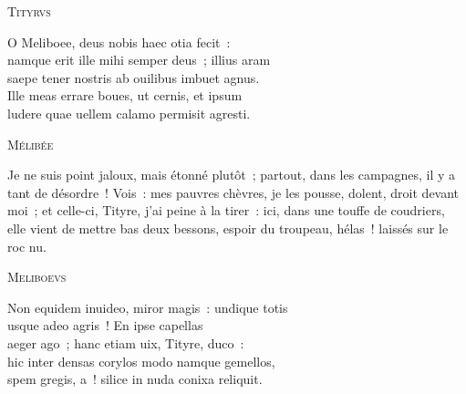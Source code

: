 \documentclass[a4paper,12pt,twoside, titlepage]{book}
\begin{document}
\begin{alignment}
\begin{translation}
\end{translation}

\begin{edition}
    \begin{center}\textsc{Tityrvs}\end{center}
    \begin{ekdverse}
O Meliboee, deus nobis haec otia fecit~:\\
namque erit ille mihi semper deus~; illius aram\\
saepe tener nostris ab ouilibus imbuet agnus.\\
Ille meas errare boues, ut cernis, et ipsum\\
ludere quae uellem calamo permisit agresti.\\
\end{ekdverse}
\end{edition}




\begin{translation}

\begin{center}\textsc{Mélibée}\end{center}


Je ne suis point jaloux, mais étonné plutôt~; partout, dans les campagnes, il y a tant de désordre~! Vois~: mes pauvres chèvres, je les pousse, dolent, droit devant moi~; et celle-ci, Tityre, j'ai peine à la tirer~: ici, dans une touffe de coudriers, elle vient de mettre bas deux bessons, espoir du troupeau, hélas~! laissés sur le roc nu.

\end{translation}
\begin{edition}

\begin{center}\textsc{Meliboevs}\end{center}
\begin{ekdverse}
Non equidem inuideo, miror magis~: undique totis\\
usque adeo  agris~! En ipse capellas\\
 aeger ago~; hanc etiam uix, Tityre, duco~:\\
hic inter densas corylos modo namque gemellos,\\
spem gregis, a~! silice in nuda conixa reliquit.\\
\end{ekdverse}

\end{edition}
\end{alignment}
\end{document}
